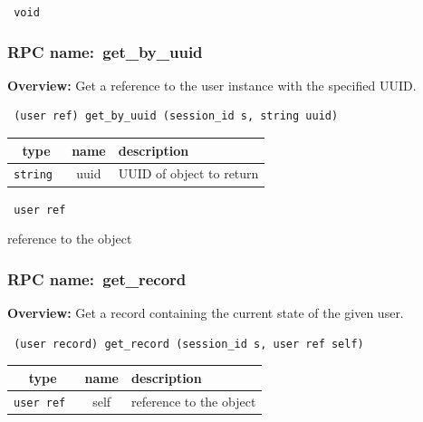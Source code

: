 \vspace{0.3cm}

{\tt 
void
}



\vspace{0.3cm}
\vspace{0.3cm}
\vspace{0.3cm}
\subsubsection{RPC name:~get\_by\_uuid}

{\bf Overview:} 
Get a reference to the user instance with the specified UUID.

\begin{verbatim} (user ref) get_by_uuid (session_id s, string uuid)\end{verbatim}



 
\vspace{0.3cm}
\begin{tabular}{|c|c|p{7cm}|}
 \hline
{\bf type} & {\bf name} & {\bf description} \\ \hline
{\tt string } & uuid & UUID of object to return \\ \hline 

\end{tabular}

\vspace{0.3cm}

{\tt 
user ref
}


reference to the object
\vspace{0.3cm}
\vspace{0.3cm}
\vspace{0.3cm}
\subsubsection{RPC name:~get\_record}

{\bf Overview:} 
Get a record containing the current state of the given user.

\begin{verbatim} (user record) get_record (session_id s, user ref self)\end{verbatim}



 
\vspace{0.3cm}
\begin{tabular}{|c|c|p{7cm}|}
 \hline
{\bf type} & {\bf name} & {\bf description} \\ \hline
{\tt user ref } & self & reference to the object \\ \hline 

\end{tabular}

